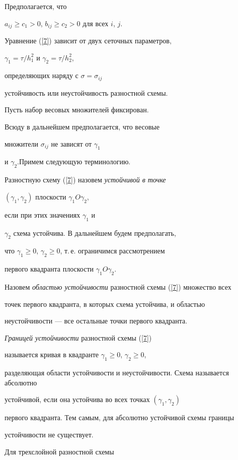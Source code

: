 Предполагается, что


$a_{ij} \ge c_1 > 0$, $b_{ij} \ge c_2 > 0$ для всех $i$, $j$.


Уравнение (\ref{7}) зависит от двух сеточных параметров,


$\gamma_{1}=\tau /h_{1}^{2}$ и $\gamma_{2}=\tau /h_{2}^{2}$,


определяющих наряду с $\sigma=\sigma_{ij}$


устойчивость или неустойчивость разностной схемы.





Пусть набор весовых множителей фиксирован. 


Всюду в дальнейшем предполагается, что весовые 


множители $\sigma_{ij}$ не зависят от $\gamma_1$ 


и $\gamma_2$.Примем следующую терминологию.


Разностную схему (\ref{7}) назовем {\it устойчивой в точке}


$(\gamma_{1},\gamma_{2})$ плоскости $\gamma_{1}O\gamma_{2}$,


если при этих значениях $\gamma_{1}$ и


$\gamma_{2}$ схема устойчива. В дальнейшем будем предполагать,


что $\gamma_{1}\ge 0$, $\gamma_{2}\ge 0$, т.\,е.{} ограничимся рассмотрением


первого квадранта плоскости $\gamma_{1}O\gamma_{2}$.


Назовем {\it областью устойчивости} разностной схемы (\ref{7}) множество всех


точек первого квадранта, в которых схема устойчива, и областью 


неустойчивости --- все остальные точки первого квадранта.


{\it Границей устойчивости } разностной схемы (\ref{7})


называется кривая в квадранте $\gamma_{1}\ge 0$, $\gamma_{2}\ge 0$,


разделяющая области устойчивости и неустойчивости. Схема называется абсолютно


устойчивой, если она устойчива во всех точках $(\gamma_{1},\gamma_{2})$


первого квадранта. Тем самым, для абсолютно устойчивой схемы границы


устойчивости не существует.


Для трехслойной разностной схемы



